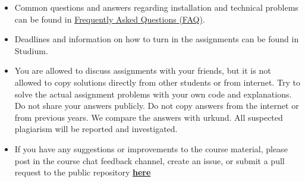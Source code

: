 \begin{itemize}
\item Common questions and answers regarding installation and technical problems can be found in \href{https://github.com/MansMeg/BSDA/blob/main/FAQ.md}{Frequently Asked Questions (FAQ)}.
\item Deadlines and information on how to turn in the assignments can be found in Studium.
\item You are allowed to discuss assignments with your friends, but it is not allowed to copy solutions directly from other students or from internet. Try to solve the actual assignment problems with your own code and explanations. Do not share your answers publicly. Do not copy answers from the internet or from previous years. We compare the answers with urkund. All suspected plagiarism will be reported and investigated.
\item If you have any suggestions or improvements to the course material, please post in the course chat feedback channel, create an issue, or submit a pull request to the public repository \href{https://github.com/MansMeg/BSDA/issues}{\textbf{here}}
\end{itemize}

